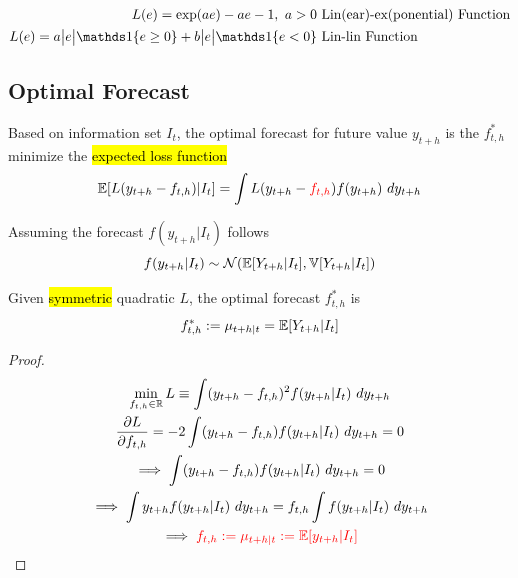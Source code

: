 \documentclass[11pt]{article}
\begin{document}
		\begin{example}
			\begin{align}
				L(e) = \exp(ae) - ae - 1,\ a > 0 & \tx{ Lin(ear)-ex(ponential) Function} \\
				L(e) = a\abs{e} \id{e \geq 0} + b\abs{e} \id{e < 0} &\tx{ Lin-lin Function}
			\end{align}
		\end{example}
		
	\subsection{Optimal Forecast}
		\begin{definition}
			Based on information set $I_t$, the optimal forecast for future value $y_{t+h}$ is the $f^*_{t,h}$ minimize the \hl{expected loss function}
			\begin{equation}
				\mathbb{E}[{L(y_{t+h} - f_{t,h})|I_t}] = \int L(y_{t+h} - \textcolor{red}{f_{t,h}}) f(y_{t+h})\ dy_{t+h}
			\end{equation}
		\end{definition}
		
		\begin{assumption}
			Assuming the forecast $f(y_{t+h}|I_t)$ follows
			\begin{equation}
				f(y_{t+h}|I_t) \sim \mathcal{{N}}(\mathbb{E}[{Y_{t+h}|I_t}], \mathbb{V}[{Y_{t+h}|I_t}])
			\end{equation}
		\end{assumption}
		
		\begin{proposition}
			Given \hl{symmetric} quadratic $L$, the optimal forecast $f^*_{t,h}$ is 
			\begin{equation}
				f_{t,h}^* := \mu_{t+h|t} = \mathbb{E}[{Y_{t+h}|I_t}]
			\end{equation}
			\begin{proof}
				\begin{gather}
					\min_{f_{t, h} \in \R} L \equiv \int (y_{t+h} - f_{t, h})^2 f(y_{t+h}|I_t)\ dy_{t+h} \\
					\pd{L}{f_{t, h}} = -2 \int (y_{t+h} - f_{t, h}) f(y_{t+h}|I_t)\ dy_{t+h} = 0 \\
					\implies \int (y_{t+h} - f_{t, h}) f(y_{t+h}|I_t)\ dy_{t+h} = 0 \\
					\implies \int y_{t+h} f(y_{t+h}|I_t)\ dy_{t+h} = f_{t, h} \int  f(y_{t+h}|I_t)\ dy_{t+h} \\
					\implies \red{f_{t, h} := \mu_{t+h|t} := \expect{y_{t+h}|I_t}}
				\end{gather}
			\end{proof}
		\end{proposition}
		
\end{document}
